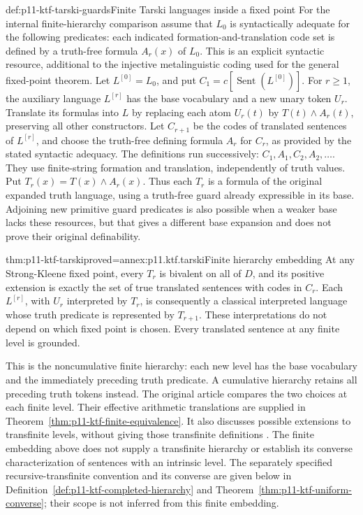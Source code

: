 \begin{hbdefinition}{def:p11-ktf-tarski-guards}{Finite Tarski languages inside a fixed point}
For the internal finite-hierarchy comparison assume that \(L_0\) is
syntactically adequate for the following predicates: each indicated
formation-and-translation code set is defined by a truth-free formula
\(A_r(x)\) of \(L_0\). This is an explicit syntactic resource,
additional to the injective metalinguistic coding used for the general
fixed-point theorem. Let \(L^{[0]}=L_0\), and put
\(C_1=c[\operatorname{Sent}(L^{[0]})]\).
For \(r\geq1\), the auxiliary language \(L^{[r]}\) has the base
vocabulary and a new unary token \(U_r\). Translate its formulas into
\(L\) by replacing each atom \(U_r(t)\) by
\(T(t)\land A_r(t)\), preserving all other constructors. Let
\(C_{r+1}\) be the codes of translated sentences of \(L^{[r]}\), and
choose the truth-free defining formula \(A_r\) for \(C_r\), as
provided by the stated syntactic adequacy. The definitions run successively:
\(C_1,A_1,C_2,A_2,\ldots\). They use finite-string formation and
translation, independently of truth values. Put
\(T_r(x)=T(x)\land A_r(x)\). Thus each \(T_r\) is a formula of
the original expanded truth language, using a truth-free guard already
expressible in its base. Adjoining new primitive guard predicates is
also possible when a weaker base lacks these resources, but that gives
a different base expansion and does not prove their original definability.
\end{hbdefinition}

\begin{hbtheorem}{thm:p11-ktf-tarski}{proved=annex:p11.ktf.tarski}{Finite hierarchy embedding}
At any Strong-Kleene fixed point, every \(T_r\) is bivalent on all of
\(D\), and its positive extension is exactly the set of true translated
sentences with codes in \(C_r\). Each \(L^{[r]}\), with \(U_r\)
interpreted by \(T_r\), is consequently a classical interpreted
language whose truth predicate is represented by \(T_{r+1}\).
These interpretations do not depend on which fixed point is chosen.
Every translated sentence at any finite level is grounded.
\end{hbtheorem}

This is the noncumulative finite hierarchy: each new level has the base
vocabulary and the immediately preceding truth predicate. A cumulative
hierarchy retains all preceding truth tokens instead. The original article
compares the two choices at each finite level. Their effective arithmetic
translations are supplied in Theorem~\ref{thm:p11-ktf-finite-equivalence}.
It also discusses possible extensions to transfinite levels, without
giving those transfinite definitions \cite[p.~710 and n.~26]{Kripke1975}.
The finite embedding above does not supply a transfinite hierarchy or
establish its converse characterization of sentences with an intrinsic level.
The separately specified recursive-transfinite convention and its converse
are given below in Definition~\ref{def:p11-ktf-completed-hierarchy} and
Theorem~\ref{thm:p11-ktf-uniform-converse}; their scope is not inferred
from this finite embedding.

